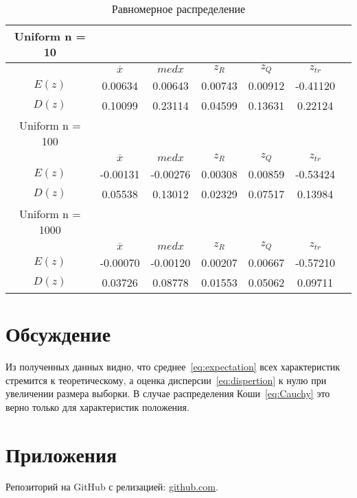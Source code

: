 \documentclass[12pt,a4paper]{scrartcl}
\begin{document}
\begin{table}[H]
  \centering
  \begin{tabular}{ | c | c | c | c | c | c | c | }
	\hline
Uniform n = 10 & & & & &  \\ \hline
         & $\overline x$& $med x$& $z_R $ & $z_Q $  &  $z_{tr}$  \\ \hline
         $E(z)$ & 0.00634 & 0.00643 & 0.00743 & 0.00912 & -0.41120 \\ \hline
         $D(z)$ & 0.10099 & 0.23114 & 0.04599 & 0.13631 & 0.22124 \\ \hline

Uniform n = 100 & & & & &  \\ \hline
         & $\overline x$& $med x$& $z_R $ & $z_Q $  &  $z_{tr}$  \\ \hline
         $E(z)$ & -0.00131 & -0.00276 & 0.00308 & 0.00859 & -0.53424 \\ \hline
         $D(z)$ & 0.05538 & 0.13012 & 0.02329 & 0.07517 & 0.13984 \\ \hline

Uniform n = 1000 & & & & &  \\ \hline
         & $\overline x$& $med x$& $z_R $ & $z_Q $  &  $z_{tr}$  \\ \hline
         $E(z)$ & -0.00070 & -0.00120 & 0.00207 & 0.00667 & -0.57210 \\ \hline
         $D(z)$ & 0.03726 & 0.08778 & 0.01553 & 0.05062 & 0.09711 \\ \hline
	\end{tabular}
  \label{table:uniform_table}
\caption{Равномерное распределение}
\end{table}

\section{Обсуждение}
Из полученных данных видно, что среднее~\eqref{eq:expectation} всех характеристик стремится к теоретическому, а оценка дисперсии~\eqref{eq:dispertion} к нулю при увеличении размера выборки. В случае распределения Коши~\eqref{eq:Cauchy} это верно только для характеристик положения.

\section{Приложения}
Репозиторий на GitHub с релизацией: \href{https://github.com/WiillyWonka/MatStat}{github.com}.
\end{document}
